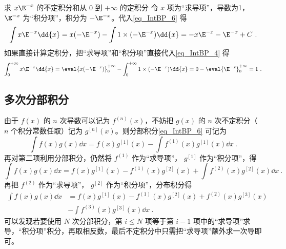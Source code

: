 \begin{example}{求 $x \E^{ - x}$ 的不定积分和从 $0$ 到 $+\infty$ 的定积分}
令 $x$ 项为“求导项”，导数为1， $\E^{ - x}$ 为“积分项”，积分为 $-\E^{ - x}$。代入\autoref{eq_IntBP_6} 得
\begin{equation}
\int x \E^{ - x} \dd{x}  = x(-\E^{ - x}) - \int 1 \times (-\E^{ - x}) \dd{x}  =  - x \E^{ - x} - \E^{ - x} + C~.
\end{equation}
如果直接计算定积分，把“求导项”和“积分项”直接代入\autoref{eq_IntBP_4} 得
\begin{equation}
\int_0^{+\infty} x \E^{-x} \dd{x}  = \eval{ x( - \E^{-x}) }_0^{ + \infty } - \int_0^{+\infty} 1 \times (-\E^{-x}) \dd{x}  = 0 - \eval{ \E^{-x} }_0^{+\infty} = 1~.
\end{equation}
\end{example}

\subsection{多次分部积分}
由于 $f(x)$ 的 $n$ 次导数可以记为 $f^{(n)}(x)$，不妨把 $g(x)$ 的 $n$ 次不定积分（ $n$ 个积分常数任取）记为 $g^{[n]}(x)$。则分部积分\autoref{eq_IntBP_6} 可记为
\begin{equation}
\int f(x)g(x) \dd{x}  = f(x) g^{[1]}(x) - \int f^{(1)}(x) g^{[1]}(x) \dd{x}~.
\end{equation}
再对第二项利用分部积分，仍然将 $f^{(1)}$ 作为“求导项”， $g^{[1]}$ 作为“积分项”，得
\begin{equation}
\int f(x)g(x) \dd{x}  = f(x) g^{[1]}(x) - f^{(1)}(x) g^{[2]}(x) + \int f^{(2)}(x) g^{[2]}(x) \dd{x}~.
\end{equation}
再把 $f^{(2)}$ 作为“求导项”， $g^{[2]}$ 作为“积分项”，分布积分得
\begin{equation}
\begin{aligned}
\int f(x)g(x) \dd{x} &= f(x) g^{[1]}(x) - f^{(1)}(x) g^{[2]}(x) + f^{(2)}(x)g^{[3]}(x) \\
&- \int f^{(3)}(x) g^{[3]}(x) \dd{x}~.
\end{aligned}
\end{equation}
可以发现若要使用 $N$ 次分部积分，第 $i \leqslant N$ 项等于第 $i-1$ 项中的“求导项”求导，“积分项”积分，再取相反数，最后不定积分中只需把“求导项”额外求一次导即可。 

